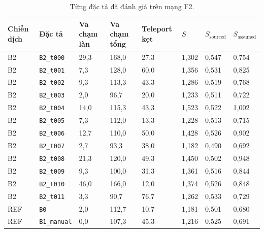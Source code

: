 \documentclass[../DoAn.tex]{subfiles}
\begin{document}
\begin{table}[H]
\centering
\footnotesize\setlength{\tabcolsep}{3pt}
\caption{Từng đặc tả đã đánh giá trên mạng F2.}
\label{table:4.interim_specs}
\begin{tabular}{|p{1.2cm}|p{2.6cm}|p{1.5cm}|p{1.6cm}|p{1.6cm}|p{1.3cm}|p{1.6cm}|p{1.6cm}|}
\hline
\textbf{Chiến dịch} & \textbf{Đặc tả} & \textbf{Va chạm làn} & \textbf{Va chạm tổng} & \textbf{Teleport kẹt} & \textbf{$S$} & \textbf{$S_{\text{sourced}}$} & \textbf{$S_{\text{assumed}}$} \\ \hline
B2 & \texttt{B2\_t000} & 29,3 & 168,0 & 27,3 & 1,302 & 0,547 & 0,754 \\ \hline
B2 & \texttt{B2\_t001} & 7,3 & 128,0 & 60,0 & 1,356 & 0,531 & 0,825 \\ \hline
B2 & \texttt{B2\_t002} & 9,3 & 113,3 & 43,3 & 1,286 & 0,519 & 0,768 \\ \hline
B2 & \texttt{B2\_t003} & 2,0 & 96,7 & 20,0 & 1,233 & 0,511 & 0,722 \\ \hline
B2 & \texttt{B2\_t004} & 14,0 & 115,3 & 43,3 & 1,523 & 0,522 & 1,002 \\ \hline
B2 & \texttt{B2\_t005} & 7,3 & 112,0 & 13,3 & 1,228 & 0,513 & 0,715 \\ \hline
B2 & \texttt{B2\_t006} & 12,7 & 110,0 & 50,0 & 1,428 & 0,526 & 0,902 \\ \hline
B2 & \texttt{B2\_t007} & 2,7 & 93,3 & 38,0 & 1,182 & 0,490 & 0,692 \\ \hline
B2 & \texttt{B2\_t008} & 21,3 & 120,0 & 49,3 & 1,450 & 0,502 & 0,948 \\ \hline
B2 & \texttt{B2\_t009} & 9,3 & 100,0 & 31,3 & 1,361 & 0,516 & 0,844 \\ \hline
B2 & \texttt{B2\_t010} & 46,0 & 166,0 & 12,0 & 1,374 & 0,526 & 0,848 \\ \hline
B2 & \texttt{B2\_t011} & 3,3 & 90,7 & 76,7 & 1,262 & 0,533 & 0,729 \\ \hline
REF & \texttt{B0} & 2,0 & 112,7 & 10,7 & 1,181 & 0,501 & 0,680 \\ \hline
REF & \texttt{B1\_manual} & 0,0 & 107,3 & 45,3 & 1,216 & 0,525 & 0,691 \\ \hline
\end{tabular}
\end{table}
\end{document}
